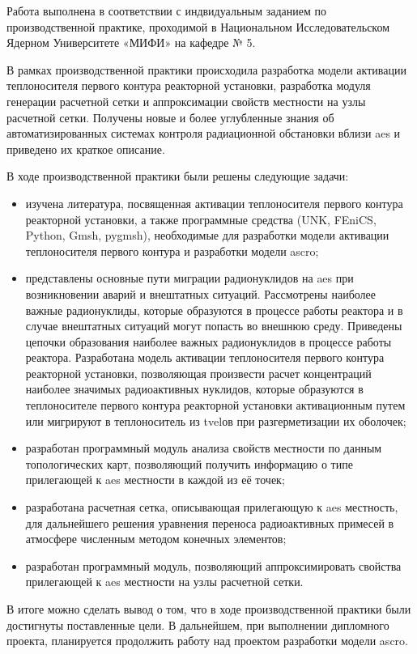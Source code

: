 
Работа выполнена в соответствии с индвидуальным заданием по производственной практике, проходимой в Национальном 
Исследовательском Ядерном Университете «МИФИ» на кафедре № 5.

В рамках производственной практики происходила разработка модели активации теплоносителя первого контура реакторной 
установки, разработка модуля генерации расчетной сетки и аппроксимации свойств местности на узлы расчетной сетки. 
Получены новые и более углубленные знания об автоматизированных системах контроля радиационной обстановки вблизи 
\ac{aes} и приведено их краткое описание.

В ходе производственной практики были решены следующие задачи:
\begin{itemize}
	\item изучена литература, посвященная активации теплоносителя первого контура реакторной установки, а также 
	программные средства (UNK, FEniCS, Python, Gmsh, pygmsh), необходимые для разработки модели активации теплоносителя 
	первого контура и разработки модели \ac{ascro};
	\item представлены основные пути миграции радионуклидов на \ac{aes} при возникновении аварий и внештатных ситуаций. 
	Рассмотрены наиболее важные радионуклиды, которые образуются в процессе работы реактора и в случае внештатных 
	ситуаций могут попасть во внешнюю среду. Приведены цепочки образования наиболее важных радионуклидов в процессе 
	работы реактора. Разработана модель активации теплоносителя первого контура реакторной установки, позволяющая 
	произвести расчет концентраций наиболее значимых радиоактивных нуклидов, которые образуются в теплоносителе первого 
	контура реакторной установки активационным путем или мигрируют в теплоноситель из \ac{tvel}ов при разгерметизации 
	их оболочек;
	\item разработан программный модуль анализа свойств местности по данным топологических карт, позволяющий получить 
	информацию о типе прилегающей к \ac{aes} местности в каждой из её точек;
	\item разработана расчетная сетка, описывающая прилегающую к \ac{aes} местность, для дальнейшего решения уравнения 
	переноса радиоактивных примесей в атмосфере численным методом конечных элементов;
	\item разработан программный модуль, позволяющий аппроксимировать свойства прилегающей к \ac{aes} местности на узлы 
	расчетной сетки. 
\end{itemize}

В итоге можно сделать вывод о том, что в ходе производственной практики были достигнуты поставленные цели. В дальнейшем,
при выполнении дипломного проекта, планируется продолжить работу над проектом разработки модели \ac{ascro}.   